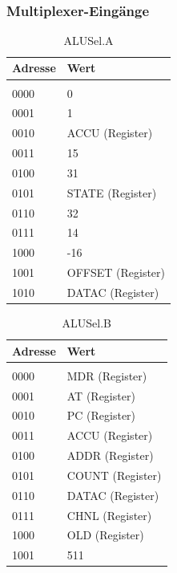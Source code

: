 \documentclass[12pt,titlepage]{article}
\begin{document}
\leavevmode \\

\subsubsection{Multiplexer-Eingänge}

\begin{table}[h!]
    \begin{tabular}{l|l}
    Adresse & Wert              \\
    \hline  					\\
    0000     & 0                 \\
    0001     & 1                 \\
    0010     & ACCU (Register)   \\
    0011     & 15                \\
    0100     & 31                \\
    0101     & STATE (Register)  \\
    0110     & 32                \\
    0111     & 14                \\
    1000     & -16               \\
    1001     & OFFSET (Register) \\
    1010     & DATAC (Register)  \\
    \end{tabular}
    \caption{ALUSel.A}
\end{table}

\begin{table}[h!]
    \begin{tabular}{l|l}
    Adresse & Wert            \\
    \hline                    \\
    0000     & MDR (Register)  \\
    0001     & AT (Register)   \\
    0010     & PC (Register)   \\
    0011     & ACCU (Register) \\
    0100     & ADDR (Register) \\
    0101     & COUNT (Register) \\
    0110     & DATAC (Register) \\
    0111     & CHNL (Register) \\
    1000     & OLD (Register)  \\
    1001     & 511             \\
    \end{tabular}
    \caption{ALUSel.B}
\end{table}
\end{document}
